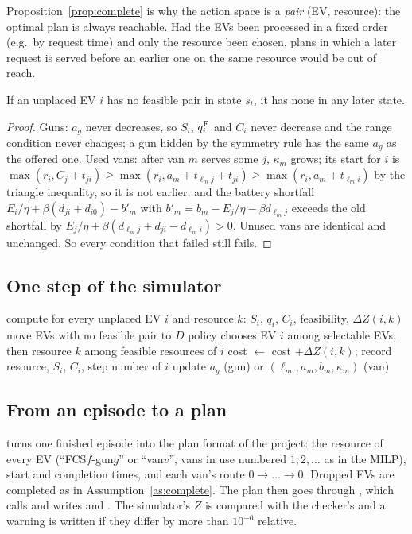 Proposition~\ref{prop:complete} is why the action space is a \emph{pair} (EV, resource): the optimal plan is always reachable. Had the EVs been processed in a fixed order (e.g.\ by request time) and only the resource been chosen, plans in which a later request is served before an earlier one on the same resource would be out of reach.

\begin{proposition}\label{prop:dead}
If an unplaced EV $i$ has no feasible pair in state $s_t$, it has none in any later state.
\end{proposition}
\begin{proof}
Guns: $a_g$ never decreases, so $S_i$, $q^{\mathrm{F}}_i$ and $C_i$ never decrease and the range condition never changes; a gun hidden by the symmetry rule has the same $a_g$ as the offered one. Used vans: after van $m$ serves some $j$, $\kappa_m$ grows; its start for $i$ is $\max(r_i,C_j+t_{ji})\ge\max(r_i,a_m+t_{\ell_m j}+t_{ji})\ge\max(r_i,a_m+t_{\ell_m i})$ by the triangle inequality, so it is not earlier; and the battery shortfall $E_i/\eta+\beta(d_{ji}+d_{i0})-b'_m$ with $b'_m=b_m-E_j/\eta-\beta d_{\ell_m j}$ exceeds the old shortfall by $E_j/\eta+\beta(d_{\ell_m j}+d_{ji}-d_{\ell_m i})>0$. Unused vans are identical and unchanged. So every condition that failed still fails.
\end{proof}

\subsection{One step of the simulator}

\begin{algorithm}[H]
\caption{One construction step (all rows of the batch at once)}
\DontPrintSemicolon
compute for every unplaced EV $i$ and resource $k$: $S_i$, $q_i$, $C_i$, feasibility, $\Delta Z(i,k)$ 
move EVs with no feasible pair to $D$ 
policy chooses EV $i$ among selectable EVs, then resource $k$ among feasible resources of $i$\;
cost $\leftarrow$ cost $+\Delta Z(i,k)$; record resource, $S_i$, $C_i$, step number of $i$\;
update $a_g$ (gun) or $(\ell_m,a_m,b_m,\kappa_m)$ (van) 
\end{algorithm}

\subsection{From an episode to a plan}

 turns one finished episode into the plan format of the project: the resource of every EV (``FCS$f$-gun$g$'' or ``van$v$'', vans in use numbered $1,2,\dots$ as in the MILP), start and completion times, and each van's route $0\to\dots\to0$. Dropped EVs are completed as in Assumption~\ref{as:complete}. The plan then goes through , which calls  and writes  and . The simulator's $Z$ is compared with the checker's and a warning is written if they differ by more than $10^{-6}$ relative.
